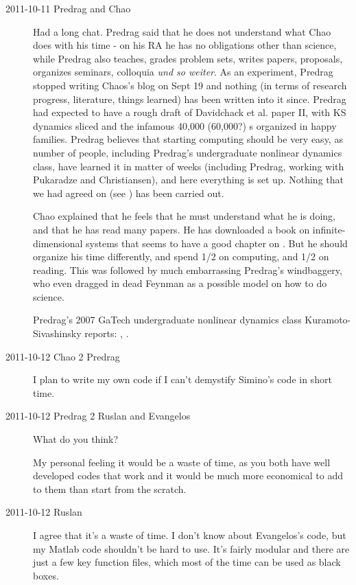 \begin{description}
\item[2011-10-11 Predrag and Chao]
Had a long chat. Predrag said that he does not understand what Chao does with his time -
on his RA he has no obligations other than science, while Predrag also teaches, grades
problem sets, writes papers, proposals, organizes seminars, colloquia \emph{und so weiter}. As
an experiment, Predrag stopped writing Chaos's blog on Sept 19 and nothing (in terms of
research progress, literature, things learned) has been written into it since.
Predrag had expected
to have a rough draft of Davidchack et al. paper II, with KS dynamics sliced and the
infamous 40,000 (60,000?) \rpo s organized in happy families. Predrag believes that
starting computing should be very easy, as number of people, including Predrag's
undergraduate nonlinear dynamics class, have learned it in matter of
weeks (including Predrag, working with Pukaradze and Christiansen), and here everything
is set up. Nothing that we had agreed on (see ) has been carried out.

Chao explained that he feels that he must understand what he is doing, and that
he has read many papers. He has downloaded a book on infinite-dimensional systems that
seems to have a good chapter on \KS. But he should organize his time differently,
and spend 1/2 on computing, and 1/2 on reading. This was followed by much embarrassing
Predrag's windbaggery, who even dragged in dead Feynman as a possible model on how to do
science.

Predrag's
2007 GaTech undergraduate nonlinear dynamics class
Kuramoto-Sivashinsky reports:
,
.


\item[2011-10-12 Chao 2 Predrag] I plan to write my own code if I can't demystify
Simino's code in short time.

\item[2011-10-12 Predrag 2 Ruslan and Evangelos]
What do you think?

My personal feeling it would be a waste of time, as you both have well developed
codes that work and
it would be much more economical to add to them than start from the scratch.

\item[2011-10-12 Ruslan]
I agree that it's a waste of time.  I don't know about Evangelos's code,
but my Matlab code shouldn't be hard to use.  It's fairly modular and
there are just a few key function files, which most of the time can
be used as black boxes.


\end{description}
